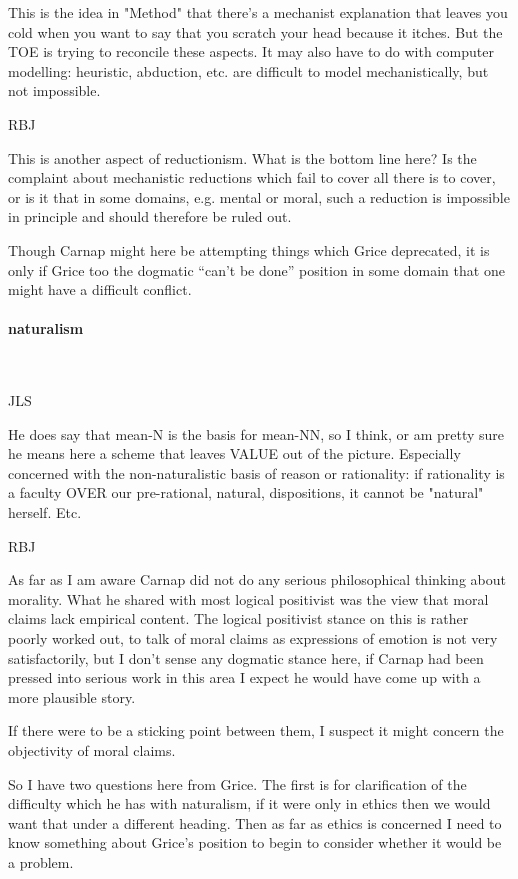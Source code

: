 \documentclass[10pt,titlepage]{book}
\begin{document}
This is the idea in "Method" that there's a mechanist  
explanation that leaves you cold when you want to say that you scratch your head  
because it itches. But the TOE is trying to reconcile these aspects. It may 
also  have to do with computer modelling: heuristic, abduction, etc. are 
difficult to  model mechanistically, but not impossible.
 
RBJ

This is another aspect of reductionism.
What is the bottom line here?
Is the complaint about mechanistic reductions which fail to cover all there is to cover, or is it that in some domains, e.g. mental or moral, such a reduction is impossible in principle and should therefore be ruled out.

Though Carnap might here be attempting things which Grice deprecated, it is only if Grice too the dogmatic ``can't be done'' position in some domain that one might have a difficult conflict.
 
\paragraph{naturalism}\ 

JLS

He does say that mean-N is the basis for mean-NN, so I think,  
or am pretty sure he means here a scheme that leaves VALUE out of the 
picture.  Especially concerned with the non-naturalistic basis of reason or 
rationality:  if rationality is a faculty OVER our pre-rational, natural, 
dispositions, it  cannot be "natural" herself. Etc. 

RBJ

As far as I am aware Carnap did not do any serious philosophical thinking about morality.
What he shared with most logical positivist was the view that moral claims lack empirical content.
The logical positivist stance on this is rather poorly worked out, to talk of moral claims as expressions of emotion is not very satisfactorily, but I don't sense any dogmatic stance here, if Carnap had been pressed into serious work in this area I expect he would have come up with a more plausible story.

If there were to be a sticking point between them, I suspect it might concern the objectivity of moral claims.

So I have two questions here from Grice.
The first is for clarification of the difficulty which he has with naturalism, if it were only in ethics then we would want that under a different heading.
Then as far as ethics is concerned I need to know something about Grice's position to begin to consider whether it would be a problem. 
\end{document}
